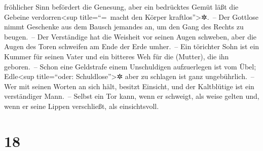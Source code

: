 fröhlicher Sinn befördert die Genesung, aber ein bedrücktes Gemüt läßt
die Gebeine verdorren\textless sup title=``=~macht den Körper
kraftlos''\textgreater✲.~-- Der Gottlose nimmt Geschenke
aus dem Bausch jemandes an, um den Gang des Rechts zu beugen.~--
Der Verständige hat die Weisheit vor seinen Augen
schweben, aber die Augen des Toren schweifen am Ende der Erde umher.~--
Ein törichter Sohn ist ein Kummer für seinen Vater und
ein bitteres Weh für die (Mutter), die ihn geboren.~--
Schon eine Geldstrafe einem Unschuldigen aufzuerlegen ist
vom Übel; Edle\textless sup title=``oder: Schuldlose''\textgreater✲ aber
zu schlagen ist ganz ungebührlich.~-- Wer mit seinen
Worten an sich hält, besitzt Einsicht, und der Kaltblütige ist ein
verständiger Mann.~-- Selbst ein Tor kann, wenn er
schweigt, als weise gelten und, wenn er seine Lippen verschließt, als
einsichtsvoll.

\hypertarget{section-17}{%
\section{18}\label{section-17}}

